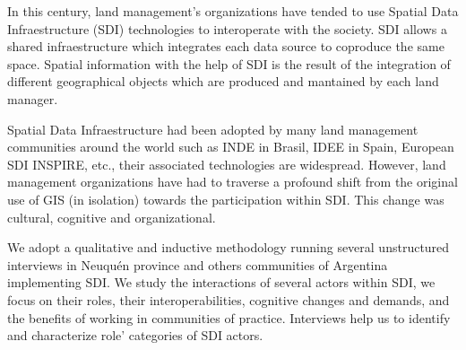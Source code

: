 \documentclass[10pt,twocolumn,ieeetran]{article}
\begin{document}







In this century, land management's organizations have tended to use Spatial Data Infraestructure (SDI) technologies to interoperate with the society. SDI allows a shared infraestructure which integrates each data source to coproduce the same space. Spatial information with the help of SDI is the result of the integration of different geographical objects which are produced and mantained by each land manager.

Spatial Data Infraestructure had been adopted by many land management communities around the world such as   INDE in Brasil, IDEE in Spain, European SDI INSPIRE, etc., their associated technologies are widespread. However, land management organizations have had to traverse a profound shift from the original use of GIS (in isolation) towards the participation within SDI.
This change was cultural, cognitive and organizational.

We adopt a qualitative and inductive methodology running several unstructured interviews in Neuqu\' en province and others communities of Argentina implementing SDI. We study the interactions of several actors within SDI, we focus on their roles, their interoperabilities, cognitive changes and demands, and the benefits of working in communities of practice.  Interviews help us to identify and characterize role'
categories of SDI actors.
\end{document}
